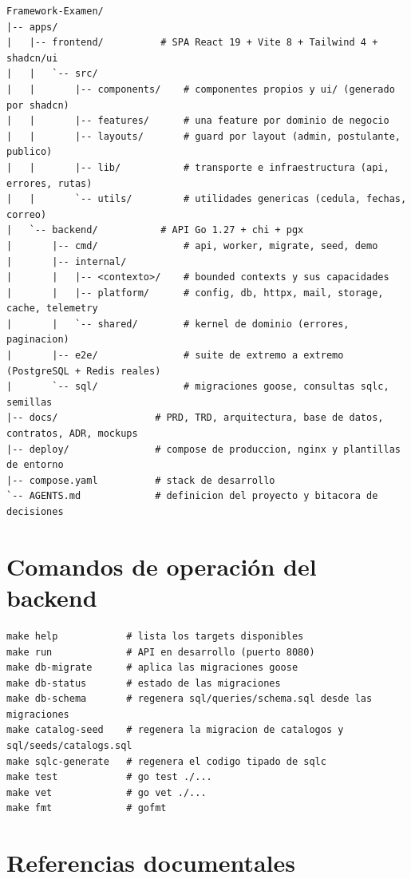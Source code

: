 \documentclass[11pt,a4paper]{article}
\begin{document}
\begin{lstlisting}[language=bshlite,caption={Mapa del workspace (extracto)}]
Framework-Examen/
|-- apps/
|   |-- frontend/          # SPA React 19 + Vite 8 + Tailwind 4 + shadcn/ui
|   |   `-- src/
|   |       |-- components/    # componentes propios y ui/ (generado por shadcn)
|   |       |-- features/      # una feature por dominio de negocio
|   |       |-- layouts/       # guard por layout (admin, postulante, publico)
|   |       |-- lib/           # transporte e infraestructura (api, errores, rutas)
|   |       `-- utils/         # utilidades genericas (cedula, fechas, correo)
|   `-- backend/           # API Go 1.27 + chi + pgx
|       |-- cmd/               # api, worker, migrate, seed, demo
|       |-- internal/
|       |   |-- <contexto>/    # bounded contexts y sus capacidades
|       |   |-- platform/      # config, db, httpx, mail, storage, cache, telemetry
|       |   `-- shared/        # kernel de dominio (errores, paginacion)
|       |-- e2e/               # suite de extremo a extremo (PostgreSQL + Redis reales)
|       `-- sql/               # migraciones goose, consultas sqlc, semillas
|-- docs/                 # PRD, TRD, arquitectura, base de datos, contratos, ADR, mockups
|-- deploy/               # compose de produccion, nginx y plantillas de entorno
|-- compose.yaml          # stack de desarrollo
`-- AGENTS.md             # definicion del proyecto y bitacora de decisiones
\end{lstlisting}

\section{Comandos de operaci\'on del backend}

\begin{lstlisting}[language=bshlite,caption={Targets del Makefile del backend}]
make help            # lista los targets disponibles
make run             # API en desarrollo (puerto 8080)
make db-migrate      # aplica las migraciones goose
make db-status       # estado de las migraciones
make db-schema       # regenera sql/queries/schema.sql desde las migraciones
make catalog-seed    # regenera la migracion de catalogos y sql/seeds/catalogs.sql
make sqlc-generate   # regenera el codigo tipado de sqlc
make test            # go test ./...
make vet             # go vet ./...
make fmt             # gofmt
\end{lstlisting}

\section{Referencias documentales}
\end{document}
